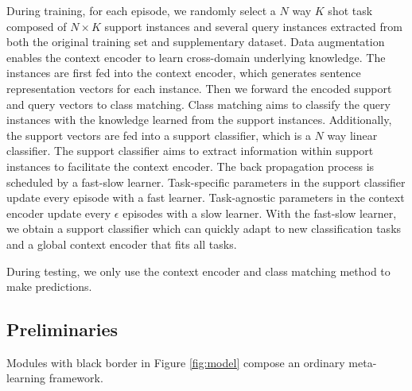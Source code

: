 During training, for each episode, we randomly select a $N$ way $K$ shot task composed of $N \times K$ support instances and several query instances extracted from both the original training set and supplementary dataset.
Data augmentation enables the context encoder to learn cross-domain underlying knowledge.
The instances are first fed into the context encoder, which generates sentence representation vectors for each instance.
Then we forward the encoded support and query vectors to class matching. Class matching aims to classify the query instances with the knowledge learned from the support instances.
Additionally, the support vectors are fed into a support classifier, which is a $N$ way linear classifier.
The support classifier aims to extract information within support instances to facilitate the context encoder.
The back propagation process is scheduled by a fast-slow learner. Task-specific parameters in the support classifier update every episode with a fast learner. Task-agnostic parameters in the context encoder update every $\epsilon$ episodes with a slow learner.
With the fast-slow learner, we obtain a support classifier which can quickly adapt to new classification tasks and a global context encoder that fits all tasks.

During testing, we only use the context encoder and class matching method to make predictions.

\subsection{Preliminaries}
Modules with black border in Figure \ref{fig:model} compose an ordinary meta-learning framework.

